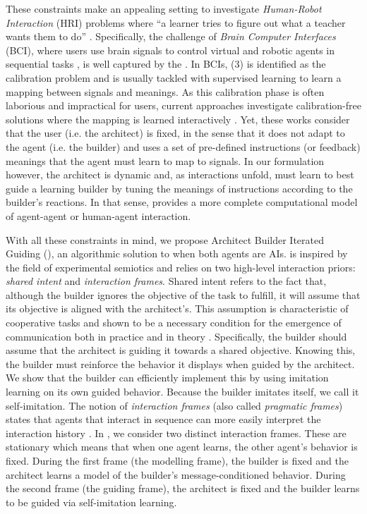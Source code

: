 These constraints make \abp an appealing setting to investigate \textit{Human-Robot Interaction} (HRI) \cite{goodrich2008human} problems where ``a learner tries to figure out what a teacher wants them to do'' \cite{grizou2013robot,cederborg2014social}. Specifically, the challenge of \textit{Brain Computer Interfaces} (BCI), where users use brain signals to control virtual and robotic agents in sequential tasks \cite{Katyal2014,deBettencourt2015ClosedloopTO,Mishra2015ClosedloopCT,MUNOZMOLDES2020681,Chiang2021Closed}, is well captured by the \abp.
In BCIs, (3) is identified as the calibration problem and is usually tackled with supervised learning to learn a mapping between signals and meanings. As this calibration phase is often laborious and impractical for users, current approaches investigate calibration-free solutions where the mapping is learned interactively \cite{grizou:hal-00984068,xie2021interaction}.
Yet, these works consider that the user (i.e. the architect) is fixed, in the sense that it does not adapt to the agent (i.e. the builder) and uses a set  of pre-defined instructions (or feedback) meanings that the agent must learn to map to signals. In our \abp formulation however, the architect is dynamic and, as interactions unfold, must learn to best guide a learning builder by tuning the meanings of instructions according to the builder's reactions. In that sense, \abp provides a
more complete computational model of agent-agent or human-agent interaction. 

With all these constraints in mind, we propose Architect Builder Iterated Guiding (\abig), an algorithmic solution to \abp when both agents are AIs. \abig is inspired by the field of experimental semiotics and relies on two high-level interaction priors: \emph{shared intent} and \emph{interaction frames}. Shared intent refers to the fact that, although the builder ignores the objective of the task to fulfill, it will assume that its objective is aligned with the architect's. This assumption is characteristic of cooperative tasks and shown to be a necessary condition for the emergence of communication both in practice \cite{foerster2016learning, cao2018emergent} and in theory \cite{crawford1982strategic}. Specifically, the builder should assume that the architect is guiding it towards a shared objective. Knowing this, the builder must reinforce the behavior it displays when guided by the architect. We show that the builder can efficiently implement this by using imitation learning on its own guided behavior. Because the builder imitates itself, we call it self-imitation.  The notion of \emph{interaction frames} (also called \emph{pragmatic frames}) states that agents that interact in sequence can more easily interpret the interaction history \cite{bruner1985child,vollmer2016pragmatic}. In \abig, we consider two distinct interaction frames. These are stationary which means that when one agent learns, the other agent’s behavior is fixed. During the first frame (the modelling frame), the builder is fixed and the architect learns a model of the builder's message-conditioned behavior. During the second frame (the guiding frame), the architect is fixed and the builder learns to be guided via self-imitation learning. 

